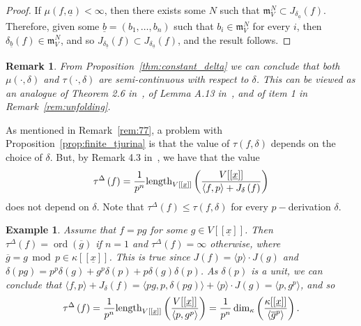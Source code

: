 \documentclass{article}
\newtheorem{example}[theorem]{Example}
\newtheorem{remark}[theorem]{Remark}
\DeclareMathOperator{\ord}{ord}
\newcommand{\maxV}{\mathfrak{m}_V}
\newcommand{\Vx}{V[[\underline{x}]]}
\numberwithin{theorem}{section}
\renewcommand{\mod}{\,\operatorname{mod}\,}
\begin{document}
\begin{proof}
    If $\mu(f, \underline{a})<\infty$, then there exists some $N$ such that $\maxV^N \subset J_{\delta_{\underline{a}}}(f)$. Therefore, given some $\underline{b} =(b_1, \dots, b_n)$ such that  $b_i\in \maxV^N$ for every $i$, then $\delta_{\underline{b}}(f) \in \maxV^N$, and so $J_{\delta_{\underline{b}}}(f) \subset J_{\delta_{\underline{a}}}(f)$, and the result follows. 
\end{proof}

\begin{remark}
    \textup{From Proposition~\ref{thm:constant_delta} we can conclude that both $\mu(\cdot, \delta)$ and $\tau( \cdot, \delta)$ are semi-continuous with respect to $\delta$. This can be viewed as an analogue of Theorem 2.6 in~\cite{greuel2007introduction}, of Lemma A.13 in~\cite{greuel2016right}, and of item 1 in Remark~\ref{rem:unfolding}. }
\end{remark}



As mentioned in Remark~\ref{rem:77}, a problem with Proposition~\ref{prop:finite_tjurina} is that the value of $\tau(f, \delta)$ depends on the choice of $\delta$.  But, by Remark 4.3 in~\cite{hochster2021jacobian},  we have that the value $$\tau^\Delta\left(f\right) = \frac{1}{p^n} \textup{length}_{\Vx} \left(\frac{V [[\underline{x}]]}{\langle f, p \rangle + J_\delta\left(f\right)}\right)$$ does not depend on $\delta$. Note that  $\tau^\Delta\left(f\right) \leq \tau(f, \delta)$ for every $p-$derivation $\delta$.  


\begin{example}
    \textup{Assume that $f=pg$ for some $g \in \Vx$. Then $\tau^\Delta(f)=\ord(\overline{g})$ if $n=1$ and $\tau^\Delta(f)=\infty$ otherwise, where $\overline{g} = g \mod p \in \kappa[[\underline{x}]]$. This is true since $J(f)=\langle p \rangle \cdot J(g)$ and $\delta(pg)=p^p \delta(g) + g^p \delta(p) + p \delta(g)\delta(p)$. As $\delta(p)$ is a unit,  we can conclude that $\langle f, p \rangle + J_\delta(f)=\langle pg, p , \delta(pg) \rangle + \langle p \rangle \cdot J(g) = \langle p , g^p \rangle$, and so }
    \begin{equation*}
        \tau^\Delta\left(f\right) = \frac{1}{p^n} \textup{length}_{\Vx} \left(\frac{V [[\underline{x}]]}{\langle p , g^p \rangle}\right) = \frac{1}{p^n} \dim_\kappa \left(\frac{\kappa[[\underline{x}]]}{ \langle \overline{g}^p \rangle} \right).
    \end{equation*}
\end{example}
    
\end{document}
